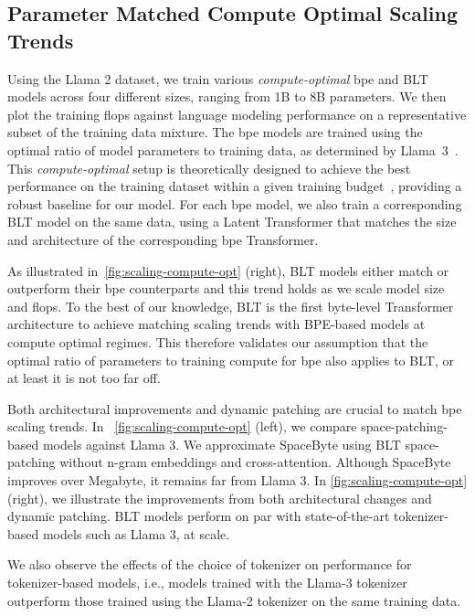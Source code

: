\subsection{Parameter Matched Compute Optimal Scaling Trends}
\label{section:parameter-matched-scaling}
Using the Llama 2 dataset, we train various \textit{compute-optimal} bpe and {\textsc BLT} models across four different sizes, ranging from 1B to 8B parameters. We then plot the training flops against language modeling performance on a representative subset of the training data mixture. The bpe models are trained using the optimal ratio of model parameters to training data, as determined by Llama~3~\citep{dubey2024llama}. This \textit{compute-optimal} setup is theoretically designed to achieve the best performance on the training dataset within a given training budget~\citep{hoffmann2022training}, providing a robust baseline for our model. For each bpe model, we also train a corresponding {\textsc BLT} model on the same data, using a Latent Transformer that matches the size and architecture of the corresponding bpe Transformer.

As illustrated in~\autoref{fig:scaling-compute-opt} (right), {\textsc BLT} models either match or outperform their bpe counterparts and this trend holds as we scale model size and flops. To the best of our knowledge, {\textsc BLT} is the first byte-level Transformer architecture to achieve matching scaling trends with BPE-based models at compute optimal regimes. This therefore validates our assumption that the optimal ratio of parameters to training compute for bpe also applies to {\textsc BLT}, or at least it is not too far off.     

Both architectural improvements and dynamic patching are crucial to match bpe scaling trends. In ~\autoref{fig:scaling-compute-opt} (left), we compare space-patching-based models against Llama 3. We approximate SpaceByte \citep{slagle2024spacebyte} using {\textsc BLT} space-patching without n-gram embeddings and cross-attention. Although SpaceByte improves over Megabyte, it remains far from  Llama 3. In \autoref{fig:scaling-compute-opt} (right), we illustrate the improvements from both architectural changes and dynamic patching. {\textsc BLT} models perform on par with state-of-the-art tokenizer-based models such as  Llama 3, at scale.

We also observe the effects of the choice of tokenizer on performance for tokenizer-based models, i.e., models trained with the Llama-3 tokenizer outperform those trained using the Llama-2 tokenizer on the same training data.

